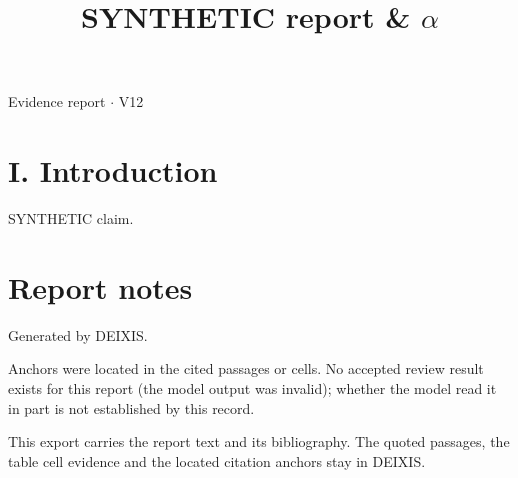 \documentclass[journal]{IEEEtran}
\begin{document}
\title{SYNTHETIC report \& \ensuremath{\alpha}}

\maketitle

\noindent Evidence report \ensuremath{\cdot} V12

\section*{I. Introduction}

SYNTHETIC claim. \cite{Synth26}

\section*{Report notes}

Generated by DEIXIS.

Anchors were located in the cited passages or cells. No accepted review result exists for this report (the model output was invalid); whether the model read it in part is not established by this record.

This export carries the report text and its bibliography. The quoted passages, the table cell evidence and the located citation anchors stay in DEIXIS.




\end{document}
